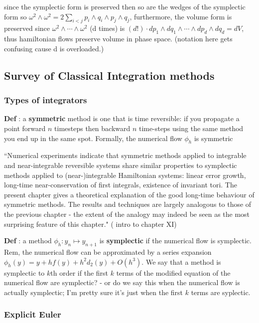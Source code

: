\documentclass[12pt]{article}
\begin{document}
since the symplectic form is preserved then so are the wedges of the symplectic form so $\omega^2\wedge\omega^2 = 2\sum_{i<j}p_i\wedge q_i\wedge p_j\wedge q_j$, furthermore, the volume form is preserved since $\omega^2\wedge \cdots \wedge \omega^2$ (d times) is $(d!) \cdot dp_1\wedge dq_1\wedge \cdots \wedge dp_d\wedge dq_d = dV$, thus hamiltonian flows preserve volume in phase space. (notation here gets confusing cause d is overloaded.) 


\subsection{Survey of Classical Integration methods}
\subsubsection{Types of integrators}

\textbf{Def} : a \textbf{symmetric} method is one that is time reversible: if you propagate a point forward $n$ timesteps then backward $n$ time-steps using the same method you end up in the same spot. Formally, the numerical flow $\phi_h$ is symmetric  

``Numerical experiments indicate that symmetric methods applied to integrable and near-integrable reversible systems share similar properties to symplectic methods applied to (near-)integrable Hamiltonian systems: linear error growth, long-time near-conservation of first integrals, existence of invariant tori. The present chapter gives a theoretical explanation of the good long-time behaviour of symmetric methods. The results and techniques are largely analogous to those of the previous chapter - the extent of the analogy may indeed be seen as the most surprising feature of this chapter." (\cite{Numerical} intro to chapter XI)

\textbf{Def} : a method $\phi_h : y_n\mapsto y_{n+1}$ is \textbf{symplectic} if the numerical flow is symplectic. Rem, the numerical flow can be approximated by a series expansion $\phi_h(y) = y + hf(y) + h^2d_2(y) + O(h^3)$. We say that a method is symplectic to $k$th order if the first $k$ terms of the modified equation of the numerical flow are symplectic? - or do we say this when the numerical flow is actually symplectic; I'm pretty sure it's just when the first $k$ terms are syplectic. 

\subsubsection{Explicit Euler}
\end{document}
